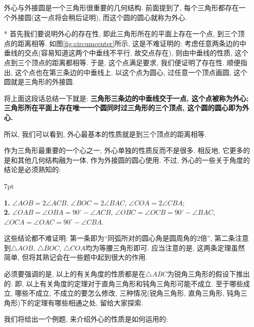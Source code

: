 \documentclass{book}
\newenvironment{theorem}{%
\def\FrameCommand{%
\hspace{1pt}%
{\color{cyan!60!blue}\vrule width 2pt}%
{\color{cyan!10}\vrule width 4pt}%
\colorbox{cyan!10}%
}%
\MakeFramed{\advance\hsize-\width\FrameRestore}%
\noindent\hspace{-4.55pt}%
\begin{adjustwidth}{}{7pt}%
\vspace{2pt}\vspace{2pt}%
}
{%
\vspace{2pt}\end{adjustwidth}\endMakeFramed%
}
\begin{document}
\begin{paracol}{2}
外心与外接圆是一个三角形很重要的几何结构. 前面提到了, 每个三角形都存在一个外接圆(这一点将会稍后证明), 而这个圆的圆心就称为外心.\par
\switchcolumn[0]*
首先我们要说明外心的存在性, 即此三角形所在的平面上存在一个点, 到三个顶点的距离相等. 如图\ref{fig:circumcenter}所示, 这是不难证明的: 考虑任意两条边的中垂线的交点(容易知道这两个中垂线不平行, 故交点存在), 则由中垂线的性质, 这个点到三个顶点的距离都相等. 于是, 这个点满足要求, 我们便证明了存在性. 顺便指出, 这个点也在第三条边的中垂线上. 以这个点为圆心, 过任意一个顶点画圆, 这个圆就是三角形的外接圆.
\par
将上面这段话总结一下就是: \textbf{三角形三条边的中垂线交于一点, 这个点被称为外心; 三角形所在平面上存在唯一一个圆同时过三角形的三个顶点, 这个圆的圆心即为外心.}\par
所以, 我们可以看到, 外心最基本的性质就是到三个顶点的距离相等.\par
作为三角形最重要的一个心之一, 外心单独的性质反而不是很多. 相反地, 它更多的是和其他几何结构融为一体, 作为外接圆的圆心使用. 不过, 外心的一些关于角度的结论是必须熟知的:\par
\begin{theorem}
\textbf{1. }$\angle AOB=2\angle ACB$, $\angle BOC=2\angle BAC$, $\angle COA=2\angle CBA$;\\
\textbf{2. }$\angle OAB=\angle OBA=90^\circ-\angle ACB$, $\angle OBC=\angle OCB=90^\circ-\angle BAC$, $\angle OCA=\angle OAC=90^\circ-\angle CBA$.
\end{theorem}\par
\switchcolumn[0]

这些结论都不难证明: 第一条即为“同弧所对的圆心角是圆周角的2倍”, 第二条注意到$\triangle AOB$, $\triangle BOC$, $\triangle COA$均为等腰三角形即可. 应当注意的是, 这两条定理虽然简单, 但将其熟记会在一些题中起到很大的作用. \par
必须要强调的是, 以上的有关角度的性质都是在$\triangle ABC$为锐角三角形的假设下推出的. 即, 以上有关角度的定理对于直角三角形和钝角三角形可能不成立. 至于哪些成立, 哪些不成立, 不成立的要怎么修改, 三种情况(锐角三角形, 直角三角形, 钝角三角形)下的定理有哪些相通之处, 留给大家探索. \par
我们将给出一个例题, 来介绍外心的性质是如何运用的:


\end{paracol}
\end{document}
